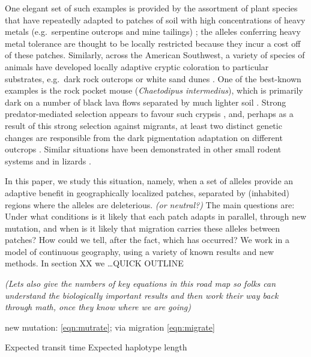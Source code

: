 \documentclass{article}
\newcommand{\gc}[1]{{\it\color{green}(#1)} }
\newcommand{\plr}[1]{{\it\color{blue}(#1)}}
\begin{document}
One elegant set of such examples is provided by the assortment of plant species 
that have repeatedly adapted to patches of soil with high concentrations of heavy metals
(e.g.\ serpentine outcrops and mine tailings) \citep{turner2010serpentine,mimulus};
the alleles conferring heavy metal tolerance are thought to be locally restricted 
because they incur a cost off of these patches. 
Similarly, across the American Southwest, a variety of species of animals have developed locally adaptive cryptic coloration
to particular substrates, e.g.\ dark rock outcrops or white sand dunes \citep{benson1933concealing}.
One of the best-known examples is the rock pocket mouse (\textit{Chaetodipus intermedius}),
which is primarily dark on a number of black lava flows separated by much lighter soil \citep{dice1940ecologic}.
Strong predator-mediated selection appears to favour such crypsis \citep{kaufman1974adaptive},
and, perhaps as a result of this strong selection against migrants, 
at least two distinct genetic changes are responsible from the dark pigmentation adaptation on different outcrops \citep{nachman2003different}. 
Similar situations have been demonstrated in other small rodent systems \citep{steiner2009genetic,kingsley2009melanism}
and in lizards \citep{whitesands}.

In this paper, we study this situation, namely,
when a set of alleles provide an adaptive benefit in geographically localized patches, 
separated by (inhabited) regions where the alleles are deleterious.
\plr{or neutral?}
The main questions are:
Under what conditions is it likely that each patch adapts in parallel, through new mutation,
and when is it likely that migration carries these alleles between patches?
How could we tell, after the fact, which has occurred?
We work in a model of continuous geography,
using a variety of known results and new methods.
In section XX we \dots QUICK OUTLINE

\gc{Lets also give the numbers of key equations in this road map so
  folks can understand the biologically important results and then work
  their way back through math, once they know where we are going}

  new mutation: \eqref{eqn:mutrate}; 
 via migration  \eqref{eqn:migrate}


Expected transit time \label{eqn:mean_tau}
Expected haplotype length \label{eqn:haplotype_length}

\end{document}
